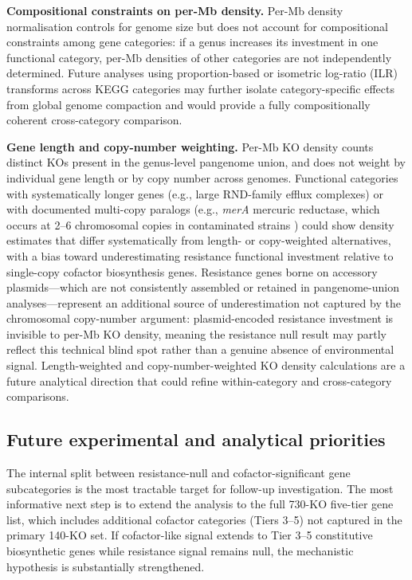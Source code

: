 \documentclass[times]{zHenriquesLab-StyleBioRxiv}
\begin{document}
\textbf{Compositional constraints on per-Mb density.} Per-Mb density
normalisation controls for genome size but does not account for compositional
constraints among gene categories: if a genus increases its investment in one
functional category, per-Mb densities of other categories are not independently
determined. Future analyses using proportion-based or isometric log-ratio (ILR)
transforms across KEGG categories may further isolate category-specific effects
from global genome compaction and would provide a fully compositionally coherent
cross-category comparison.

\textbf{Gene length and copy-number weighting.} Per-Mb KO density counts
distinct KOs present in the genus-level pangenome union, and does not weight
by individual gene length or by copy number across genomes. Functional
categories with systematically longer genes (e.g., large RND-family efflux
complexes) or with documented multi-copy paralogs (e.g., \textit{merA}
mercuric reductase, which occurs at 2--6 chromosomal copies in contaminated
strains \cite{silver2005}) could show density estimates that differ
systematically from length- or copy-weighted alternatives, with a bias toward
underestimating resistance functional investment relative to single-copy
cofactor biosynthesis genes. Resistance genes borne on accessory
plasmids---which are not consistently assembled or retained in pangenome-union
analyses---represent an additional source of underestimation not captured by
the chromosomal copy-number argument: plasmid-encoded resistance investment is
invisible to per-Mb KO density, meaning the resistance null result may partly
reflect this technical blind spot rather than a genuine absence of
environmental signal. Length-weighted and copy-number-weighted KO
density calculations are a future analytical direction that could refine
within-category and cross-category comparisons.



\subsection*{Future experimental and analytical priorities}

The internal split between resistance-null and cofactor-significant gene
subcategories is the most tractable target for follow-up investigation. The most
informative next step is to extend the analysis to the full 730-KO five-tier
gene list, which includes additional cofactor categories (Tiers 3--5) not
captured in the primary 140-KO set. If cofactor-like signal extends to Tier 3--5
constitutive biosynthetic genes while resistance signal remains null, the
mechanistic hypothesis is substantially strengthened.
\end{document}

